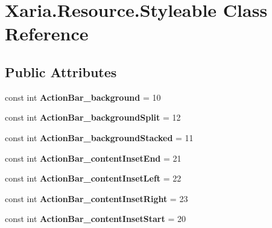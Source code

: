 \hypertarget{classXaria_1_1Resource_1_1Styleable}{}\section{Xaria.\+Resource.\+Styleable Class Reference}
\label{classXaria_1_1Resource_1_1Styleable}
\subsection*{Public Attributes}
\begin{DoxyCompactItemize}
\item 
\mbox{\label{classXaria_1_1Resource_1_1Styleable_a0084542ad04d8173ba53f27c8677942f}} 
const int {\bfseries Action\+Bar\+\_\+background} = 10
\item 
\mbox{\label{classXaria_1_1Resource_1_1Styleable_a891b1a4ae5ee8d7016f9285b4cb0e096}} 
const int {\bfseries Action\+Bar\+\_\+background\+Split} = 12
\item 
\mbox{\label{classXaria_1_1Resource_1_1Styleable_aa48245ce1d8434edd219b8fad7e3aefa}} 
const int {\bfseries Action\+Bar\+\_\+background\+Stacked} = 11
\item 
\mbox{\label{classXaria_1_1Resource_1_1Styleable_a36a011f1f8e5e7d967a43ea3a1ded5c3}} 
const int {\bfseries Action\+Bar\+\_\+content\+Inset\+End} = 21
\item 
\mbox{\label{classXaria_1_1Resource_1_1Styleable_a9a81ac3c88d7a9a17f0ce7ac23a9260a}} 
const int {\bfseries Action\+Bar\+\_\+content\+Inset\+Left} = 22
\item 
\mbox{\label{classXaria_1_1Resource_1_1Styleable_ac9fc3ba61b0ebe9240f111999345a31a}} 
const int {\bfseries Action\+Bar\+\_\+content\+Inset\+Right} = 23
\item 
\mbox{\label{classXaria_1_1Resource_1_1Styleable_aae4c3f713984388ba6ba711c4b23e2e0}} 
const int {\bfseries Action\+Bar\+\_\+content\+Inset\+Start} = 20
\item 

\end{DoxyCompactItemize}
